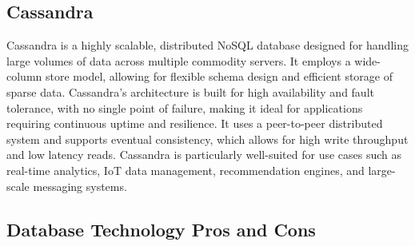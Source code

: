 \subsection*{Cassandra}

Cassandra is a highly scalable, distributed NoSQL database designed for handling large volumes of data across multiple commodity servers. It employs a wide-column store model, allowing for flexible schema design and efficient storage of sparse data. Cassandra's architecture is built for high availability and fault tolerance, with no single point of failure, making it ideal for applications requiring continuous uptime and resilience. It uses a peer-to-peer distributed system and supports eventual consistency, which allows for high write throughput and low latency reads. Cassandra is particularly well-suited for use cases such as real-time analytics, IoT data management, recommendation engines, and large-scale messaging systems.\cite{cassandra}

\subsection{Database Technology Pros and Cons}

\newpage

